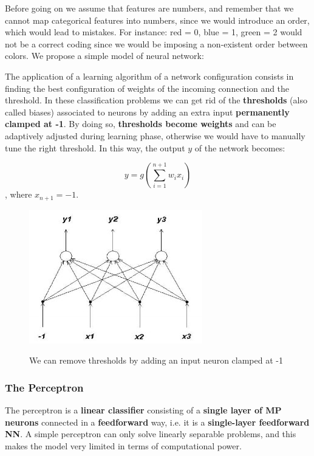Before going on we assume that features are numbers, and remember that we cannot map categorical features into numbers, since we would introduce an order, which would lead to mistakes. For instance: red = 0, blue = 1, green = 2 would not be a correct coding since we would be imposing a non-existent order between colors. We propose a simple model of neural network:


The application of a learning algorithm of a network configuration consists in finding the best configuration of weights of the incoming connection and the threshold. In these classification problems we can get rid of the \textbf{thresholds} (also called biases) associated to neurons by adding an extra input \textbf{permanently clamped at -1}. By doing so,\textbf{ thresholds become weights} and can be adaptively adjusted during learning phase, otherwise we would have to manually tune the right threshold. In this way, the output $y$ of the network becomes:

$$
y = g\left(\sum\limits_{i = 1}^{n+1} w_ix_i\right)
$$
, where $x_{n+1} = -1$.

\begin{figure}[h!]
		\centering
        \includegraphics[scale = 1.5]{img/thresholds.jpg}
		\label{mi}
        \caption{We can remove thresholds by adding an input neuron clamped at -1}
\end{figure}

\subsubsection{The Perceptron}
The perceptron is a \textbf{linear classifier} consisting of a \textbf{single layer of MP neurons} connected in a \textbf{feedforward} way, i.e. it is a \textbf{single-layer feedforward NN}. A simple perceptron can only solve linearly separable problems, and this makes the model very limited in terms of computational power. 

